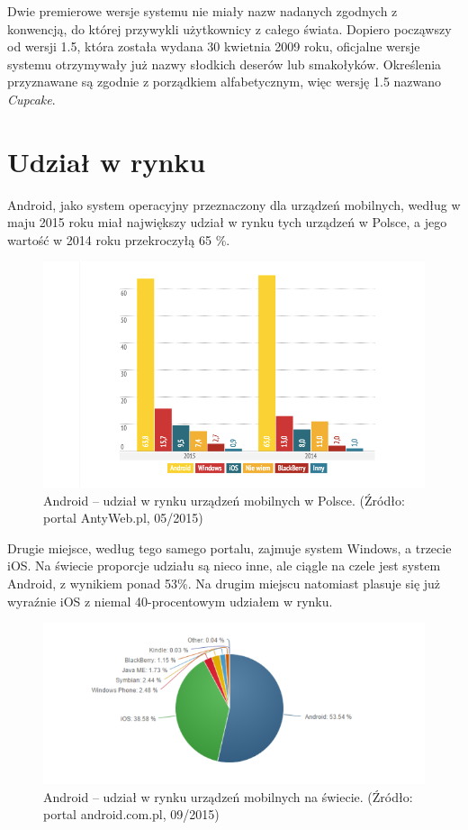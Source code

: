 Dwie premierowe wersje systemu nie miały nazw nadanych zgodnych z konwencją, do której przywykli użytkownicy z całego świata. Dopiero począwszy od wersji 1.5, która została wydana 30 kwietnia 2009 roku, oficjalne wersje systemu otrzymywały już nazwy słodkich deserów lub smakołyków. Określenia przyznawane są zgodnie z porządkiem alfabetycznym, więc wersję 1.5 nazwano \textit{Cupcake}.

\section{Udział w rynku}
Android, jako system operacyjny przeznaczony dla urządzeń mobilnych, według \cite{website:android:stat1} w maju 2015 roku miał największy udział w rynku tych urządzeń w Polsce, a jego wartość w 2014 roku przekroczyłą 65 \%. 

\begin{figure}[!htb]
    \centering
    \includegraphics[width=15cm]{imgs/ch2_android_udzial_1.png}
    \caption
{Android – udział w rynku urządzeń mobilnych w Polsce. (Źródło: portal AntyWeb.pl, 05/2015)}
    \label{fig:android_udzial_polska}
\end{figure} 

Drugie miejsce, według tego samego portalu, zajmuje system Windows, a trzecie iOS. Na świecie proporcje udziału są nieco inne, ale ciągle na czele jest system Android, z wynikiem ponad 53\%. Na drugim miejscu natomiast plasuje się już wyraźnie iOS z niemal 40-procentowym udziałem w rynku.

\begin{figure}[!htb]
    \centering
    \includegraphics[width=17cm]{imgs/ch2_android_udzial_2.png}
    \caption
{Android – udział w rynku urządzeń mobilnych na świecie. (Źródło: portal android.com.pl, 09/2015)}
    \label{fig:android_udzial_zagranica}
\end{figure} 

